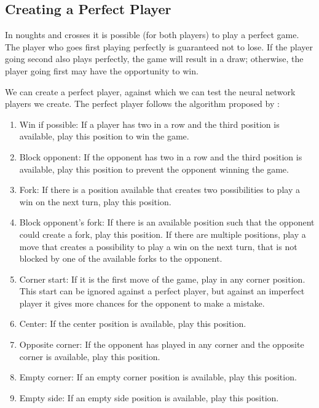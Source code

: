 \documentclass{somasmsc}
\begin{document}
\subsection{Creating a Perfect Player}

In noughts and crosses it is possible (for both players) to play a perfect game. The player who goes first playing perfectly is guaranteed not to lose. If the player going second also plays perfectly, the game will result in a draw; otherwise, the player going first may have the opportunity to win.

We can create a perfect player, against which we can test the neural network players we create. The perfect player follows the algorithm proposed by \citep{crowley1993flexible}:

\begin{enumerate}
    \item Win if possible: If a player has two in a row and the third position is available, play this position to win the game.
    \item Block opponent: If the opponent has two in a row and the third position is available, play this position to prevent the opponent winning the game.
    \item Fork: If there is a position available that creates two possibilities to play a win on the next turn, play this position.
    \item Block opponent's fork: If there is an available position such that the opponent could create a fork, play this position. If there are multiple positions, play a move that creates a possibility to play a win on the next turn, that is not blocked by one of the available forks to the opponent.
    \item Corner start: If it is the first move of the game, play in any corner position. This start can be ignored against a perfect player, but against an imperfect player it gives more chances for the opponent to make a mistake.
    \item Center: If the center position is available, play this position.
    \item Opposite corner: If the opponent has played in any corner and the opposite corner is available, play this position.
    \item Empty corner: If an empty corner position is available, play this position.
    \item Empty side: If an empty side position is available, play this position.
\end{enumerate}
\end{document}
